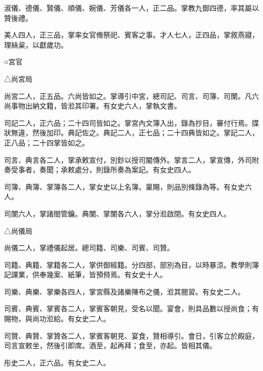 \begin{pinyinscope}
 淑儀、德儀、賢儀、順儀、婉儀、芳儀各一人，正二品。掌教九御四德，率其屬以贊後禮。



 美人四人，正三品，掌率女官脩祭祀、賓客之事。才人七人，正四品，掌敘燕寢，理絲枲，以獻歲功。



 ○宮官



 △尚宮局



 尚宮二人，正五品。六尚皆如之。掌導引中宮，總司記、司言、司簿、司闈。凡六尚事物出納文籍，皆涖其印署。有女史六人，掌執文書。



 司記二人，正六品；二十四司皆如之。掌宮內文簿入出，錄為抄目，審付行焉。牒狀無違，然後加印。典記佐之。典記二人，正七品；二十四典皆如之。掌記二人，正八品；二十四掌皆如之。



 司言、典言各二人，掌承敕宣付，別鈔以授司閽傳外。掌言二人，掌宣傳，外司附奏受事者，奏聞；承敕處分，則錄所奏為案記。有女史四人。



 司簿、典簿、掌簿各二人，掌女史以上名簿。稟賜，則品別條錄為等。有女史六人。



 司闈六人，掌諸閤管鑰。典闈、掌闈各六人，掌分涖啟閉。有女史四人。



 △尚儀局



 尚儀二人，掌禮儀起居。總司籍、司樂、司賓、司贊。



 司籍、典籍、掌籍各二人，掌供御經籍。分四部，部別為目，以時暴涼。教學則簿記課業，供奉幾案、紙筆，皆預偫焉。有女史十人。



 司樂、典樂、掌樂各四人，掌宮縣及諸樂陳布之儀，涖其閱習。有女史二人。



 司賓、典賓、掌賓各二人，掌賓客朝見，受名以聞。宴會，則具品數以授尚食；有賜物，與尚功涖給。有女史二人。



 司贊、典贊、掌贊各二人，掌賓客朝見、宴食，贊相導引。會日，引客立於殿庭，司言宣敕坐，然後引即席。酒至，起再拜；食至，亦起。皆相其儀。



 彤史二人，正六品。有女史二人。




\end{pinyinscope}
